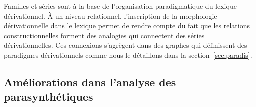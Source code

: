\documentclass[output=paper]{langsci/langscibook}
\begin{document}
Familles et séries sont à la base de l'organisation paradigmatique du lexique dérivationnel.
%
À un niveau relationnel, l'inscription de la morphologie dérivationnelle dans le lexique permet de rendre compte du fait que les relations constructionnelles forment des analogies qui connectent des séries dérivationnelles.  Ces connexions s'agrègent dans des graphes qui définissent des paradigmes dérivationnels comme nous  le détaillons dans la section~\ref{sec:paradis}.

\subsection{Améliorations dans l'analyse des parasynthétiques}
\label{sec:ameliorations-parasynthetiques}
\end{document}
